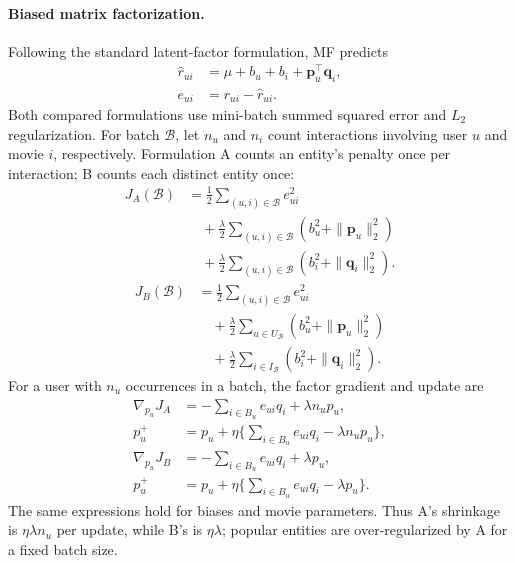 \documentclass{article}
\begin{document}
\paragraph{Biased matrix factorization.}
Following the standard latent-factor formulation, MF predicts
\begin{equation}
  \begin{aligned}
  \hat r_{ui}&=\mu+b_u+b_i+\mathbf p_u^\top\mathbf q_i,\\
  e_{ui}&=r_{ui}-\hat r_{ui}.
  \end{aligned}
\end{equation}
Both compared formulations use mini-batch summed squared error and $L_2$
regularization. For batch $\mathcal B$, let $n_u$ and $n_i$ count
interactions involving user $u$ and movie $i$, respectively. Formulation A
counts an entity's penalty once per interaction; B counts each distinct
entity once:
\begin{equation}
  \begin{aligned}
  J_A(\mathcal B)&=\frac12\sum_{(u,i)\in\mathcal B}e_{ui}^2\\
  &\quad+\frac{\lambda}{2}\sum_{(u,i)\in\mathcal B}
       (b_u^2+\|\mathbf p_u\|_2^2)\\
  &\quad+\frac{\lambda}{2}\sum_{(u,i)\in\mathcal B}
       (b_i^2+\|\mathbf q_i\|_2^2).
  \end{aligned}
\end{equation}
\begin{equation}
  \begin{aligned}
  J_B(\mathcal B)&=\frac12\sum_{(u,i)\in\mathcal B}e_{ui}^2\\
  &\quad+\frac{\lambda}{2}\sum_{u\in U_{\mathcal B}}
       (b_u^2+\|\mathbf p_u\|_2^2)\\
  &\quad+\frac{\lambda}{2}\sum_{i\in I_{\mathcal B}}
       (b_i^2+\|\mathbf q_i\|_2^2).
  \end{aligned}
\end{equation}
For a user with $n_u$ occurrences in a batch, the factor gradient and update
are
\[
\begin{aligned}
 \nabla_{p_u}J_A
   &=-\sum_{i\in B_u}e_{ui}q_i+\lambda n_up_u,\\
 p_u^+
   &=p_u+\eta\{\sum_{i\in B_u}e_{ui}q_i-\lambda n_up_u\},\\
 \nabla_{p_u}J_B
   &=-\sum_{i\in B_u}e_{ui}q_i+\lambda p_u,\\
 p_u^+
   &=p_u+\eta\{\sum_{i\in B_u}e_{ui}q_i-\lambda p_u\}.
\end{aligned}
\]
The same expressions hold for biases and movie parameters. Thus A's
shrinkage is $\eta\lambda n_u$ per update, while B's is $\eta\lambda$;
popular entities are over-regularized by A for a fixed batch size.
\end{document}
